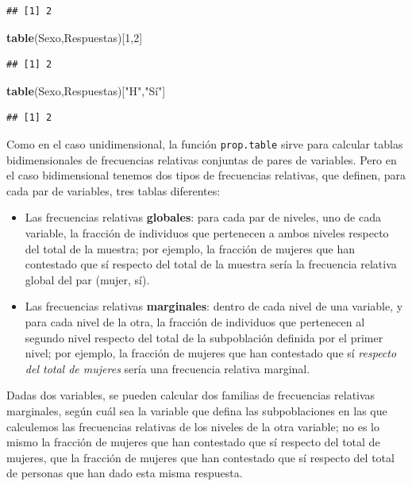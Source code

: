 \documentclass[]{book}
\newenvironment{Shaded}{\begin{snugshade}}{\end{snugshade}}
\newcommand{\DecValTok}[1]{\textcolor[rgb]{0.00,0.00,0.81}{#1}}
\newcommand{\KeywordTok}[1]{\textcolor[rgb]{0.13,0.29,0.53}{\textbf{#1}}}
\newcommand{\NormalTok}[1]{#1}
\newcommand{\StringTok}[1]{\textcolor[rgb]{0.31,0.60,0.02}{#1}}
\theoremstyle{definition}
\theoremstyle{definition}
\theoremstyle{definition}
\theoremstyle{remark}
\begin{document}
\begin{verbatim}
## [1] 2
\end{verbatim}

\begin{Shaded}
\begin{Highlighting}[]
\KeywordTok{table}\NormalTok{(Sexo,Respuestas)[}\DecValTok{1}\NormalTok{,}\DecValTok{2}\NormalTok{]}
\end{Highlighting}
\end{Shaded}

\begin{verbatim}
## [1] 2
\end{verbatim}

\begin{Shaded}
\begin{Highlighting}[]
\KeywordTok{table}\NormalTok{(Sexo,Respuestas)[}\StringTok{"H"}\NormalTok{,}\StringTok{"Sí"}\NormalTok{]}
\end{Highlighting}
\end{Shaded}

\begin{verbatim}
## [1] 2
\end{verbatim}

Como en el caso unidimensional, la función \texttt{prop.table} sirve para calcular tablas bidimensionales de frecuencias relativas conjuntas de pares de variables. Pero en el caso bidimensional tenemos dos tipos de frecuencias relativas, que definen, para cada par de variables, tres tablas diferentes:

\begin{itemize}
\item
  Las frecuencias relativas \textbf{globales}: para cada par de niveles, uno de cada variable, la fracción de individuos que pertenecen a ambos niveles respecto del total de la muestra; por ejemplo, la fracción de mujeres que han contestado que sí respecto del total de la muestra sería la frecuencia relativa global del par (mujer, sí).
\item
  Las frecuencias relativas \textbf{marginales}: dentro de cada nivel de una variable, y para cada nivel de la otra,
  la fracción de individuos que pertenecen al segundo nivel respecto del total de la subpoblación definida por el primer nivel; por ejemplo, la fracción de mujeres que han contestado que sí \emph{respecto del total de mujeres} sería una frecuencia relativa marginal.
\end{itemize}

Dadas dos variables, se pueden calcular dos familias de frecuencias relativas marginales, según cuál sea la variable que defina las subpoblaciones en las que calculemos las frecuencias relativas de los niveles de la otra variable; no es lo mismo la fracción de mujeres que han contestado que sí respecto del total de mujeres, que la fracción de mujeres que han contestado que sí respecto del total de personas que han dado esta misma respuesta.
\end{document}
